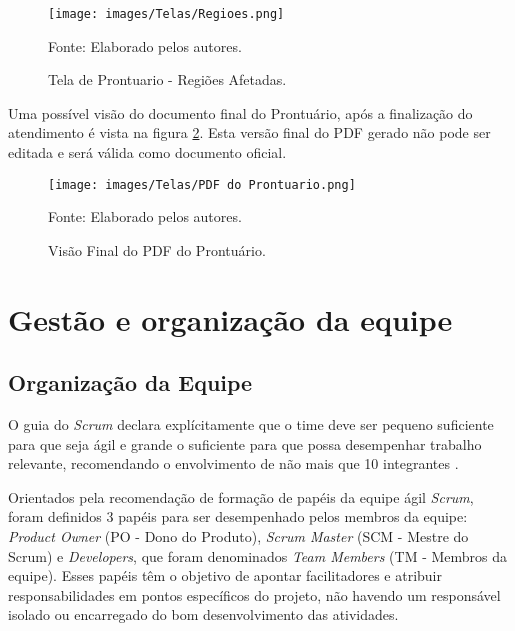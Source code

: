 \documentclass[
    12pt,               %
    openright,          %
    oneside,
    a4paper,            %
    BIBLATEX,           %
    TODO,               %
    english,            %
    brazil              %
    ]{ifsp-spo-inf-ctds}
\begin{document}
            \begin{figure}[H]
                \centering
                \caption{Tela de Prontuario - Regiões Afetadas.}
                \texttt{[image: images/Telas/Regioes.png]}

                \label{fig:Regioes}
                \centering
        {\footnotesize Fonte: Elaborado pelos autores.}
            \end{figure}    

Uma possível visão do documento final do Prontuário, após a finalização do atendimento é vista na figura \ref{fig:PdfProntuario}. Esta versão final do PDF gerado não pode ser editada e será válida como documento oficial.

    \begin{figure}[H]
                \centering
                \caption{Visão Final do PDF do Prontuário.}
                \texttt{[image: images/Telas/PDF do Prontuario.png]}

                \label{fig:PdfProntuario}
                \centering
        {\footnotesize Fonte: Elaborado pelos autores.}
            \end{figure}    

        











            
    


    \section{Gestão e organização da equipe}

        \subsection{Organização da Equipe}

            O guia do \emph{Scrum} declara explícitamente que o time deve ser pequeno suficiente para que seja ágil e grande o suficiente para que possa desempenhar trabalho relevante, recomendando o envolvimento de não mais que 10 integrantes .

            Orientados pela recomendação de formação de papéis da equipe ágil \emph{Scrum}, foram definidos 3 papéis para ser desempenhado pelos membros da equipe: \emph{Product Owner} (PO -  Dono do Produto), \emph{Scrum Master} (SCM - Mestre do Scrum) e \emph{Developers}, que foram denominados \emph{Team Members} (TM - Membros da equipe). Esses papéis têm o objetivo de apontar facilitadores e atribuir responsabilidades em pontos específicos do projeto, não havendo um responsável isolado ou encarregado do bom desenvolvimento das atividades. 
\end{document}
